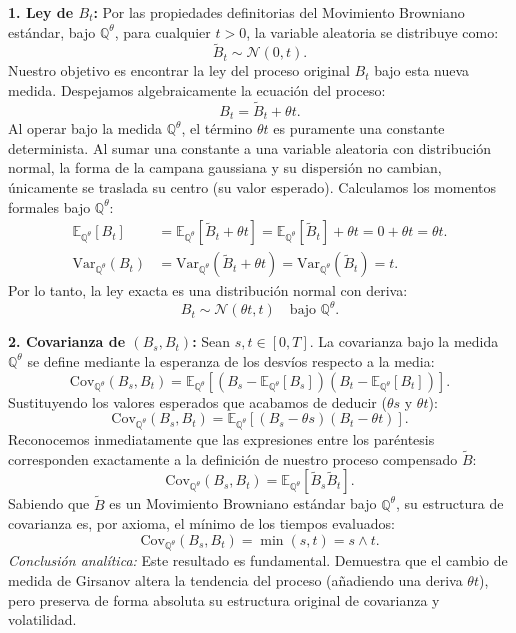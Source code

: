 \documentclass[11pt, letterpaper]{article}
\begin{document}
\begin{solucion}
    \textbf{1. Ley de $B_t$:}
    Por las propiedades definitorias del Movimiento Browniano estándar, bajo $\mathbb{Q}^\theta$, para cualquier $t > 0$, la variable aleatoria se distribuye como:
    \[ \tilde{B}_t \sim \mathcal{N}(0, t). \]
    Nuestro objetivo es encontrar la ley del proceso original $B_t$ bajo esta nueva medida. Despejamos algebraicamente la ecuación del proceso:
    \[ B_t = \tilde{B}_t + \theta t. \]
    Al operar bajo la medida $\mathbb{Q}^\theta$, el término $\theta t$ es puramente una constante determinista. Al sumar una constante a una variable aleatoria con distribución normal, la forma de la campana gaussiana y su dispersión no cambian, únicamente se traslada su centro (su valor esperado).
    Calculamos los momentos formales bajo $\mathbb{Q}^\theta$:
    \begin{align*}
        \mathbb{E}_{\mathbb{Q}^\theta}[B_t] &= \mathbb{E}_{\mathbb{Q}^\theta}[\tilde{B}_t + \theta t] = \mathbb{E}_{\mathbb{Q}^\theta}[\tilde{B}_t] + \theta t = 0 + \theta t = \theta t. \\
        \text{Var}_{\mathbb{Q}^\theta}(B_t) &= \text{Var}_{\mathbb{Q}^\theta}(\tilde{B}_t + \theta t) = \text{Var}_{\mathbb{Q}^\theta}(\tilde{B}_t) = t.
    \end{align*}
    Por lo tanto, la ley exacta es una distribución normal con deriva:
    \[ B_t \sim \mathcal{N}(\theta t, t) \quad \text{bajo } \mathbb{Q}^\theta. \]

    \textbf{2. Covarianza de $(B_s, B_t)$:}
    Sean $s, t \in [0, T]$. La covarianza bajo la medida $\mathbb{Q}^\theta$ se define mediante la esperanza de los desvíos respecto a la media:
    \[ \text{Cov}_{\mathbb{Q}^\theta}(B_s, B_t) = \mathbb{E}_{\mathbb{Q}^\theta}\left[ (B_s - \mathbb{E}_{\mathbb{Q}^\theta}[B_s])(B_t - \mathbb{E}_{\mathbb{Q}^\theta}[B_t]) \right]. \]
    Sustituyendo los valores esperados que acabamos de deducir ($\theta s$ y $\theta t$):
    \[ \text{Cov}_{\mathbb{Q}^\theta}(B_s, B_t) = \mathbb{E}_{\mathbb{Q}^\theta}\left[ (B_s - \theta s)(B_t - \theta t) \right]. \]
    Reconocemos inmediatamente que las expresiones entre los paréntesis corresponden exactamente a la definición de nuestro proceso compensado $\tilde{B}$:
    \[ \text{Cov}_{\mathbb{Q}^\theta}(B_s, B_t) = \mathbb{E}_{\mathbb{Q}^\theta}\left[ \tilde{B}_s \tilde{B}_t \right]. \]
    Sabiendo que $\tilde{B}$ es un Movimiento Browniano estándar bajo $\mathbb{Q}^\theta$, su estructura de covarianza es, por axioma, el mínimo de los tiempos evaluados:
    \[ \text{Cov}_{\mathbb{Q}^\theta}(B_s, B_t) = \min(s, t) = s \wedge t. \]
    \textit{Conclusión analítica:} Este resultado es fundamental. Demuestra que el cambio de medida de Girsanov altera la tendencia del proceso (añadiendo una deriva $\theta t$), pero preserva de forma absoluta su estructura original de covarianza y volatilidad.


\end{solucion}
\end{document}
